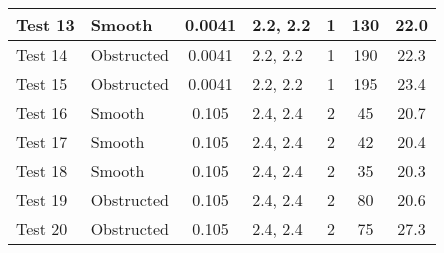 \begin{table}[!h]
\begin{center}
\begin{tabular}{|l|l|c|l|c|c|c|}
Test 13    &  Smooth        &  0.0041           &  2.2, 2.2  &  1             &  130             &  22.0              \\ \hline
Test 14    &  Obstructed    &  0.0041           &  2.2, 2.2  &  1             &  190             &  22.3              \\ \hline
Test 15    &  Obstructed    &  0.0041           &  2.2, 2.2  &  1             &  195             &  23.4              \\ \hline
Test 16    &  Smooth        &  0.105            &  2.4, 2.4  &  2             &  45              &  20.7              \\ \hline
Test 17    &  Smooth        &  0.105            &  2.4, 2.4  &  2             &  42              &  20.4              \\ \hline
Test 18    &  Smooth        &  0.105            &  2.4, 2.4  &  2             &  35              &  20.3              \\ \hline
Test 19    &  Obstructed    &  0.105            &  2.4, 2.4  &  2             &  80              &  20.6              \\ \hline
Test 20    &  Obstructed    &  0.105            &  2.4, 2.4  &  2             &  75              &  27.3              \\ \hline
\end{tabular}
\end{center}
\end{table}

